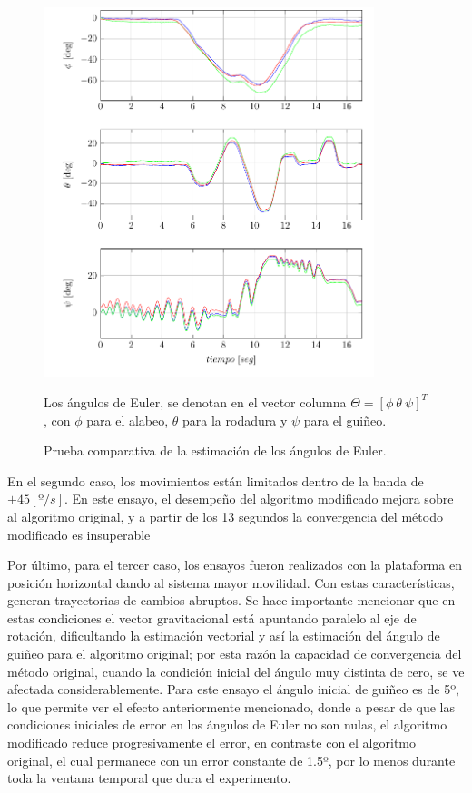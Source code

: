 \documentclass[conference]{IEEEtran}
\begin{document}
\begin{figure}
\begin{center}
\includegraphics[width=26em]{PlotAngles1.pdf}
\caption{Prueba comparativa de la estimación de los ángulos de Euler. }
\label{PlotPh1}
\scriptsize{Los ángulos de Euler, se denotan en el vector columna $\Theta=[\phi~\theta~\psi]^T$, con $\phi$ para el alabeo, $\theta$ para la rodadura y $\psi$ para el guiñeo.}
\end{center}
\end{figure}
En el segundo caso, los movimientos están limitados dentro de la banda de $\pm45[º/s]$. En este ensayo, el desempeño del algoritmo modificado mejora sobre al algoritmo original, y a partir de los 13 segundos la convergencia del método modificado es insuperable\par
Por último, para el tercer caso, los ensayos fueron realizados con la plataforma en posición horizontal dando al sistema mayor movilidad. Con estas características, generan trayectorias de cambios abruptos. Se hace importante mencionar que en estas condiciones el vector gravitacional está apuntando paralelo al eje de rotación, dificultando la estimación vectorial y así la estimación del ángulo de guiñeo para el algoritmo original; por esta razón la capacidad de convergencia del método original, cuando la condición inicial del ángulo muy distinta de cero, se ve afectada considerablemente. Para este ensayo el ángulo inicial de guiñeo es de 5º, lo que permite ver el efecto anteriormente mencionado, donde a pesar de que las condiciones iniciales de error en los ángulos de Euler no son nulas, el algoritmo modificado reduce progresivamente el error, en contraste con el algoritmo original, el cual permanece con un error constante de 1.5º, por lo menos durante toda la ventana temporal que dura el experimento.\par
\end{document}
